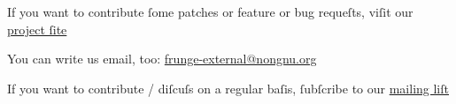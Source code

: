 \documentclass[ngerman,titlepage=on]{scrartcl}
\begin{document}

If you want to contribute ſome patches or feature or bug requeſts, viſit our
\href{http://ſv.nongnu.org/p/frunge}{project ſite}

\hypertarget{contact}{You can write us email, too:
\href{mailto:frunge-external@nongnu.org}{frunge-external@nongnu.org}}

If you want to contribute / diſcuſs on a regular baſis, ſubſcribe to our
\href{http://liſts.nongnu.org/mailman/listinfo/frunge-internal}{mailing
liſt}




\end{document}
